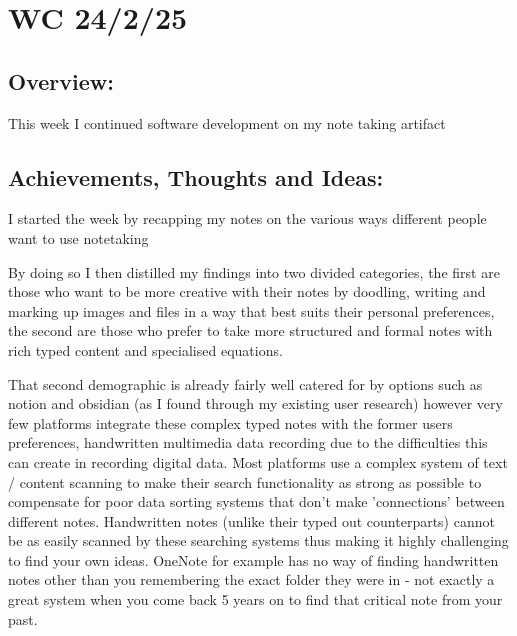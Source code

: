 \section{WC 24/2/25}

\subsection*{Overview:}
This week I continued software development on my note taking artifact

\subsection*{Achievements, Thoughts and Ideas:}
I started the week by recapping my notes on the various ways different people want to use notetaking

By doing so I then distilled my findings into two divided categories, the first are those who want to be more creative with their notes by doodling, writing and marking up images and files in a way that best suits their personal preferences, the second are those who prefer to take more structured and formal notes with rich typed content and specialised equations. 

That second demographic is already fairly well catered for by options such as notion and obsidian (as I found through my existing user research) however very few platforms integrate these complex typed notes with the former users preferences, handwritten multimedia data recording due to the difficulties this can create in recording digital data. Most platforms use a complex system of text / content scanning to make their search functionality as strong as possible to compensate for poor data sorting systems that don't make 'connections' between different notes. Handwritten notes (unlike their typed out counterparts) cannot be as easily scanned by these searching systems thus making it highly challenging to find your own ideas. OneNote for example has no way of finding handwritten notes other than you remembering the exact folder they were in - not exactly a great system when you come back 5 years on to find that critical note from your past.

